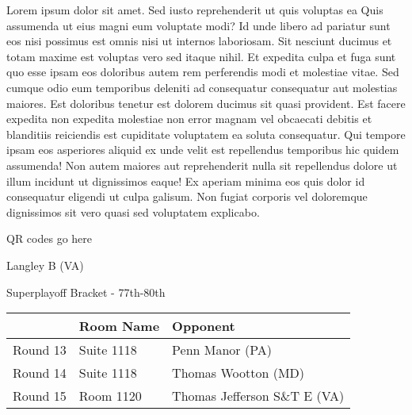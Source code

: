 \documentclass{article}%
\begin{document}
\vspace*{8pt}%
\linebreak%
\newline%
\newline%
Lorem ipsum dolor sit amet. Sed iusto reprehenderit ut quis voluptas ea Quis assumenda ut eius magni eum voluptate modi? Id unde libero ad pariatur sunt eos nisi possimus est omnis nisi ut internos laboriosam. Sit nesciunt ducimus et totam maxime est voluptas vero sed itaque nihil. Et expedita culpa et fuga sunt quo esse ipsam eos doloribus autem rem perferendis modi et molestiae vitae.\newline%
\newline%
Sed cumque odio eum temporibus deleniti ad consequatur consequatur aut molestias maiores. Est doloribus tenetur est dolorem ducimus sit quasi provident. Est facere expedita non expedita molestiae non error magnam vel obcaecati debitis et blanditiis reiciendis est cupiditate voluptatem ea soluta consequatur. Qui tempore ipsam eos asperiores aliquid ex unde velit est repellendus temporibus hic quidem assumenda!\newline%
\newline%
Non autem maiores aut reprehenderit nulla sit repellendus dolore ut illum incidunt ut dignissimos eaque! Ex aperiam minima eos quis dolor id consequatur eligendi ut culpa galisum. Non fugiat corporis vel doloremque dignissimos sit vero quasi sed voluptatem explicabo.\newline%
\newline%
%
\vspace*{30pt}%
\begin{center}%
\begin{Huge}%
QR codes go here%
\end{Huge}%
\end{center}%
\newpage%
\begin{center}%
\begin{Huge}%
Langley B (VA)%
\end{Huge}%
\vspace*{8pt}%
\linebreak%
\begin{Large}%
Superplayoff Bracket {-} 77th{-}80th%
\end{Large}%
\end{center}%
%
\begin{tabularx}{\textwidth}{|c|Y|Y|}%
\hline%
&Room Name&Opponent\\%
\hline%
Round 13&Suite 1118&Penn Manor (PA)\\%
Round 14&Suite 1118&Thomas Wootton (MD)\\%
Round 15&Room 1120&Thomas Jefferson S\&T E (VA)\\%
\hline%
\end{tabularx}%
\end{document}
